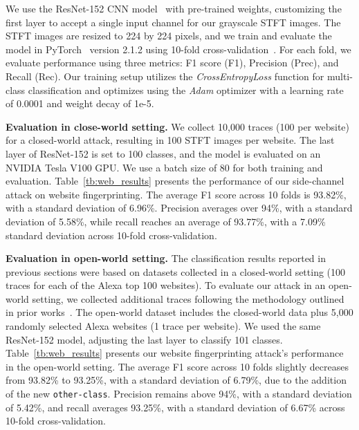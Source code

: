 We use the ResNet-152 CNN model~\cite{he2016deep} with pre-trained weights, customizing the first layer to accept a single input channel for our grayscale STFT images. The STFT images are resized to 224 by 224 pixels, and we train and evaluate the model in PyTorch~\cite{paszke2019pytorch} version 2.1.2 using 10-fold cross-validation~\cite{kohavi1995study}. For each fold, we evaluate performance using three metrics: F1 score (F1), Precision (Prec), and Recall (Rec). Our training setup utilizes the \textit{CrossEntropyLoss} function for multi-class classification and optimizes using the \textit{Adam} optimizer with a learning rate of 0.0001 and weight decay of 1e-5.

\textbf{{Evaluation in close-world setting.}} We collect 10,000 traces (100 per website) for a closed-world attack, resulting in 100 STFT images per website. The last layer of ResNet-152 is set to 100 classes, and the model is evaluated on an NVIDIA Tesla V100 GPU. We use a batch size of 80 for both training and evaluation. Table~\ref{tb:web_results} presents the performance of our side-channel attack on website fingerprinting. The average F1 score across 10 folds is 93.82\%, with a standard deviation of 6.96\%. Precision averages over 94\%, with a standard deviation of 5.58\%, while recall reaches an average of 93.77\%, with a 7.09\% standard deviation across 10-fold cross-validation.

 \textbf{{Evaluation in open-world setting.}} The classification results reported in previous sections were based on datasets collected in a closed-world setting (100 traces for each of the Alexa top 100 websites). To evaluate our attack in an open-world setting, we collected additional traces following the methodology outlined in prior works~\cite{ferguson2024webgpu, rauscher2024idleleak, wu2022rendering}. The open-world dataset includes the closed-world data plus 5,000 randomly selected Alexa websites (1 trace per website). We used the same ResNet-152 model, adjusting the last layer to classify 101 classes. Table~\ref{tb:web_results} presents our website fingerprinting attack's performance in the open-world setting. The average F1 score across 10 folds slightly decreases from 93.82\% to 93.25\%, with a standard deviation of 6.79\%, due to the addition of the new \texttt{other-class}. Precision remains above 94\%, with a standard deviation of 5.42\%, and recall averages 93.25\%, with a standard deviation of 6.67\% across 10-fold cross-validation.







